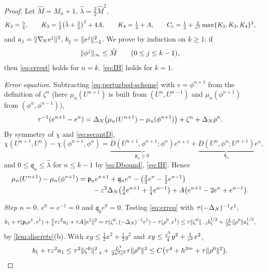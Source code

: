 \begin{proof}
Let $\hat M=M_u+1$, $\hat\lambda=\frac32\hat M^2$,
\begin{equation}\label{eq:Ks}
K_2=\tfrac54,\qquad K_3=\tfrac12\big(\hat\lambda+\tfrac32\big)^2+4A,\qquad K_4=\tfrac14+A,\qquad C_\varepsilon=\tfrac12+\tfrac2{\varepsilon^2}\max\{K_2,K_3,K_4\}^2,
\end{equation}
and $a_j=\lVert \nabla_{\!N} e^j\rVert^2$, $b_j=\lVert e^j\rVert_{-1}^2$. We prove by induction on $k\ge1$: if
\begin{equation}\label{eq:IH}
\lVert \phi^j\rVert_\infty\le\hat M\qquad(0\le j\le k-1),
\end{equation}
then \eqref{eq:errest} holds for $n=k$. \eqref{eq:IH} holds for $k=1$.

\emph{Error equation.} Subtracting \eqref{eq:perturbed-scheme} with $v=\phi^{n+1}$ from the definition of $\zeta^n$ (here $\mu_n(U^{n+1})$ is built from $(U^n,U^{n-1})$ and $\mu_n(\phi^{n+1})$ from $(\phi^n,\phi^{n-1})$),
\begin{equation}\label{eq:erreq}
\tau^{-1}(e^{n+1}-e^n)=\Delta_N\big(\mu_n(U^{n+1})-\mu_n(\phi^{n+1})\big)+\zeta^n+\Delta_N\rho^n .
\end{equation}
By symmetry of $\chi$ and \eqref{eq:secantD},
\begin{equation}\label{eq:splitchi}
\chi(U^{n+1},U^n)-\chi(\phi^{n+1},\phi^n)=\underbrace{D(U^{n+1},\phi^{n+1};\phi^n)}_{\mathfrak p_n\ge0}e^{n+1}+\underbrace{D(U^n,\phi^n;U^{n+1})}_{\mathfrak q_n}e^n,
\end{equation}
and $0\le \mathfrak q_n\le\hat\lambda$ for $n\le k-1$ by \eqref{eq:Dbound}, \eqref{eq:IH}. Hence
\begin{equation}\label{eq:mudiff}
\begin{aligned}\mu_n(U^{n+1})-\mu_n(\phi^{n+1})&=\mathfrak p_ne^{n+1}+\mathfrak q_ne^n-\big(\tfrac32e^n-\tfrac12e^{n-1}\big)\\&\qquad-\varepsilon^2\Delta_N\big(\tfrac34e^{n+1}+\tfrac14e^{n-1}\big)+A\big(e^{n+1}-2e^n+e^{n-1}\big).\end{aligned}
\end{equation}

\emph{Step $n=0$.} $e^0=e^{-1}=0$ and $\mathfrak q_0e^0=0$. Testing \eqref{eq:erreq} with $\tau(-\Delta_N)^{-1}e^1$,
\[
b_1+\tau(\mathfrak p_0e^1,e^1)+\tfrac34\tau\varepsilon^2a_1+\tau A\lVert e^1\rVert^2=\tau(\zeta^0,(-\Delta_N)^{-1}e^1)-\tau(\rho^0,e^1)\le\tau\lVert \zeta^0\rVert_{-1}b_1^{1/2}+\tfrac{\tau L}{2\pi}\lVert \rho^0\rVert a_1^{1/2},
\]
by \cref{lem:discrete}(b). With $xy\le\frac12x^2+\frac12y^2$ and $xy\le\frac{\varepsilon^2}4y^2+\frac1{\varepsilon^2}x^2$,
\begin{equation}\label{eq:firststep}
b_1+\tau\varepsilon^2a_1\le\tau^2\lVert \zeta^0\rVert_{-1}^2+\tfrac{L^2}{2\pi^2\varepsilon^2}\tau\lVert \rho^0\rVert^2\le C\big(\tau^4+h^{2m}+\tau\lVert \rho^0\rVert^2\big).
\end{equation}


\end{proof}

